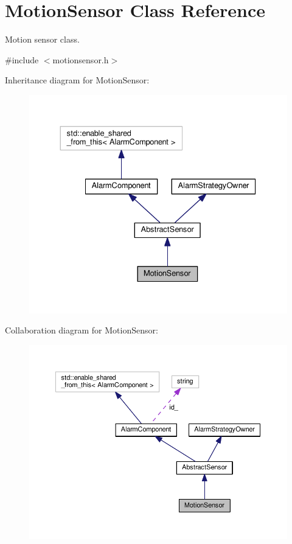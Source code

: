 \hypertarget{classMotionSensor}{}\section{Motion\+Sensor Class Reference}
\label{classMotionSensor}


Motion sensor class.  




{\ttfamily \#include $<$motionsensor.\+h$>$}



Inheritance diagram for Motion\+Sensor\+:
\nopagebreak
\begin{figure}[H]
\begin{center}
\leavevmode
\includegraphics[width=330pt]{classMotionSensor__inherit__graph}
\end{center}
\end{figure}


Collaboration diagram for Motion\+Sensor\+:
\nopagebreak
\begin{figure}[H]
\begin{center}
\leavevmode
\includegraphics[width=350pt]{classMotionSensor__coll__graph}
\end{center}
\end{figure}

